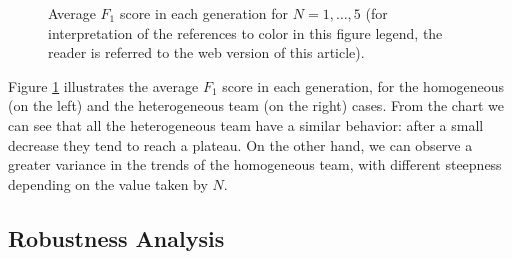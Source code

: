 \documentclass[journal]{IEEEtran}
\begin{document}
\begin{figure}[!t]
  \caption{Average $F_1$ score in each generation for $N=1,\ldots,5$ (for interpretation of the references to color in this figure legend, the reader is referred to the web version of this article).}
  \label{fig:GA_trend}
  \centering
\end{figure}

Figure \ref{fig:GA_trend} illustrates the average $F_1$ score in each generation, for the homogeneous (on the left) and the heterogeneous team (on the right) cases. From the chart we can see that all the heterogeneous team have a similar behavior: after a small decrease they tend to reach a plateau. On the other hand, we can observe a greater variance in the trends of the homogeneous team, with different steepness depending on the value taken by $N$.

\subsection{Robustness Analysis}
\end{document}
